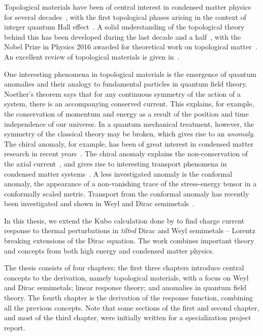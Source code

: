 %
Topological materials have been of central interest in condensed matter physics for several decades~\cite{fruchartIntroductionTopologicalInsulators2013}, with the first topological phases arising in the context of integer quantum Hall effect~\cites{klitzingNewMethodHighAccuracy1980}[as cited in][]{fruchartIntroductionTopologicalInsulators2013}.
A solid understanding of the topological theory behind this has been developed during the last decade and a half~\cite{fruchartIntroductionTopologicalInsulators2013, bernevigTopologicalInsulatorsTopological2013}, with the Nobel Prize in Physics 2016 awarded for theoretical work on topological matter~\cite{NobelPrizePhysics}.
An excellent review of topological materials is given in~\cite{fruchartIntroductionTopologicalInsulators2013}.

One interesting phenomena in topological materials is the emergence of quantum anomalies and their analogy to fundamental particles in quantum field theory.
Noether's theorem says that for any continuous symmetry of the action of a system, there is an accompanying conserved current.
This explains, for example, the conservation of momentum and energy as a result of the position and time independence of our universe.
In a quantum mechanical treatment, however, the symmetry of the classical theory may be broken, which gives rise to an \emph{anomaly}.
The chiral anomaly, for example, has been of great interest in condensed matter research in recent years~\cite{arjonaFingerprintsConformalAnomaly2019}.
The chiral anomaly explains the non-conservation of the axial current~\cite{zeeQuantumFieldTheory2010}, and gives rise to interesting transport phenomena in condensed matter systems~\cite{burkovChiralAnomalyTransport2015, wehlingDiracMaterials2014, burkovTopologicalSemimetals2016}.
A less investigated anomaly is the conformal anomaly, the appearance of a non-vanishing trace of the stress-energy tensor in a conformally scaled metric.
Transport from the conformal anomaly has recently been investigated and shown in Weyl and Dirac semimetals~\cite{chernodubAnomalousTransportDue2016, chernodubGenerationNernstCurrent2018, arjonaFingerprintsConformalAnomaly2019}.

In this thesis, we extend the Kubo calculation done by \textcite{arjonaFingerprintsConformalAnomaly2019} to find charge current response to thermal perturbations in \emph{tilted} Dirac and Weyl semimetals -- Lorentz breaking extensions of the Dirac equation.
The work combines important theory and concepts from both high energy and condensed matter physics.

The thesis consists of four chapters;
the first three chapters introduce central concepts to the derivation, namely topological materials, with a focus on Weyl and Dirac semimetals; linear response theory; and anomalies in quantum field theory.
The fourth chapter is the derivation of the response function, combining all the previous concepts.
Note that some sections of the first and second chapter, and most of the third chapter, were initially written for a specialization project report.
